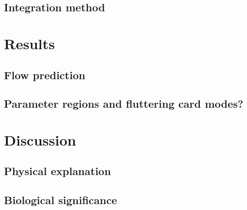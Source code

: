\documentclass{amsart}
\begin{document}
\subsection{Integration method}

\section{Results}
\subsection{Flow prediction}
\subsection{Parameter regions and fluttering card modes?}

\section{Discussion}
\subsection{Physical explanation}
\subsection{Biological significance}




\end{document}
